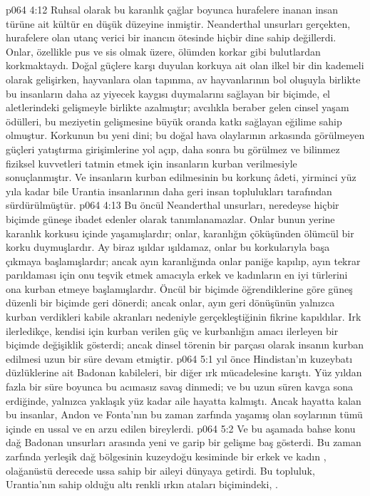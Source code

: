 \vs p064 4:12 Ruhsal olarak bu karanlık çağlar boyunca hurafelere inanan insan türüne ait kültür en düşük düzeyine inmiştir. Neanderthal unsurları gerçekten, hurafelere olan utanç verici bir inancın ötesinde hiçbir dine sahip değillerdi. Onlar, özellikle pus ve sis olmak üzere, ölümden korkar gibi bulutlardan korkmaktaydı. Doğal güçlere karşı duyulan korkuya ait olan ilkel bir din kademeli olarak gelişirken, hayvanlara olan tapınma, av hayvanlarının bol oluşuyla birlikte bu insanların daha az yiyecek kaygısı duymalarını sağlayan bir biçimde, el aletlerindeki gelişmeyle birlikte azalmıştır; avcılıkla beraber gelen cinsel yaşam ödülleri, bu meziyetin gelişmesine büyük oranda katkı sağlayan eğilime sahip olmuştur. Korkunun bu yeni dini; bu doğal hava olaylarının arkasında görülmeyen güçleri yatıştırma girişimlerine yol açıp, daha sonra bu görülmez ve bilinmez fiziksel kuvvetleri tatmin etmek için insanların kurban verilmesiyle sonuçlanmıştır. Ve insanların kurban edilmesinin bu korkunç âdeti, yirminci yüz yıla kadar bile Urantia insanlarının daha geri insan toplulukları tarafından sürdürülmüştür.
\vs p064 4:13 Bu öncül Neanderthal unsurları, neredeyse hiçbir biçimde güneşe ibadet edenler olarak tanımlanamazlar. Onlar bunun yerine karanlık korkusu içinde yaşamışlardır; onlar, karanlığın çöküşünden ölümcül bir korku duymuşlardır. Ay biraz ışıldar ışıldamaz, onlar bu korkularıyla başa çıkmaya başlamışlardır; ancak ayın karanlığında onlar paniğe kapılıp, ayın tekrar parıldaması için onu teşvik etmek amacıyla erkek ve kadınların en iyi türlerini ona kurban etmeye başlamışlardır. Öncül bir biçimde öğrendiklerine göre güneş düzenli bir biçimde geri dönerdi; ancak onlar, ayın geri dönüşünün yalnızca kurban verdikleri kabile akranları nedeniyle gerçekleştiğinin fikrine kapıldılar. Irk ilerledikçe, kendisi için kurban verilen güç ve kurbanlığın amacı ilerleyen bir biçimde değişiklik gösterdi; ancak dinsel törenin bir parçası olarak insanın kurban edilmesi uzun bir süre devam etmiştir.
\vs p064 5:1  yıl önce Hindistan’ın kuzeybatı düzlüklerine ait Badonan kabileleri, bir diğer ırk mücadelesine karıştı. Yüz yıldan fazla bir süre boyunca bu acımasız savaş dinmedi; ve bu uzun süren kavga sona erdiğinde, yalnızca yaklaşık yüz kadar aile hayatta kalmıştı. Ancak hayatta kalan bu insanlar, Andon ve Fonta’nın bu zaman zarfında yaşamış olan soylarının tümü içinde en ussal ve en arzu edilen bireylerdi.
\vs p064 5:2 Ve bu aşamada bahse konu dağ Badonan unsurları arasında yeni ve garip bir gelişme baş gösterdi. Bu zaman zarfında yerleşik dağ bölgesinin kuzeydoğu kesiminde bir erkek ve kadın , olağanüstü derecede ussa sahip bir aileyi dünyaya getirdi. Bu topluluk, Urantia’nın sahip olduğu altı renkli ırkın ataları biçimindeki, .
